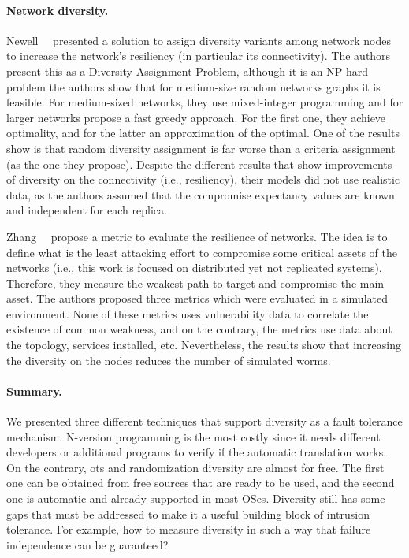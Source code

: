 \paragraph{Network diversity.}
Newell~\etal{}~\cite{Newell:2015} presented a solution to assign diversity variants among network nodes to increase the network's resiliency (in particular its connectivity).
The authors present this as a Diversity Assignment Problem, although it is an NP-hard problem the authors show that for medium-size random networks graphs it is feasible.
For medium-sized networks, they use mixed-integer programming and for larger networks propose a fast greedy approach.
For the first one, they achieve optimality, and for the latter an approximation of the optimal.
One of the results show is that random diversity assignment is far worse than a criteria assignment (as the one they propose).
Despite the different results that show improvements of diversity on the connectivity (i.e., resiliency), their models did not use realistic data, as the authors assumed that the compromise expectancy values are known and independent for each replica.


Zhang~\etal{}~\cite{Zhang:2016} propose a metric to evaluate the resilience of networks.
The idea is to define what is the least attacking effort to compromise some critical assets of the networks (i.e., this work is focused on distributed yet not replicated systems).
Therefore, they measure the weakest path to target and compromise the main asset. 
The authors proposed three metrics which were evaluated in a simulated environment.
None of these metrics uses vulnerability data to correlate the existence of common weakness, and on the contrary, the metrics use data about the topology, services installed, etc.
Nevertheless, the results show that increasing the diversity on the nodes reduces the number of simulated worms.
 


\paragraph{Summary.}
We presented three different techniques that support diversity as a fault tolerance mechanism. 
N-version programming is the most costly since it needs different developers or additional programs to verify if the automatic translation works. 
On the contrary, \gls{ots} and randomization diversity are almost for free. 
The first one can be obtained from free sources that are ready to be used, and the second one is automatic and already supported
in most OSes. 
Diversity still has some gaps that must be addressed to make it a useful building block of intrusion tolerance. 
For example, how to measure diversity in such a way that failure independence can be guaranteed?


